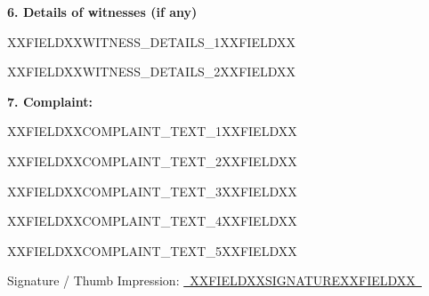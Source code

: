 \documentclass[12pt, a4paper]{article}
\newcommand{\fillline}[1]{\underline{~#1~}}
\begin{document}
\vspace{12pt}

\noindent\textbf{6. Details of witnesses (if any)}

\vspace{4pt}
\hspace{1cm}XXFIELDXXWITNESS_DETAILS_1XXFIELDXX

\vspace{4pt}
\hspace{1cm}XXFIELDXXWITNESS_DETAILS_2XXFIELDXX

\vspace{12pt}

\noindent\textbf{7. Complaint: }

\vspace{4pt}
\hspace{0.5cm}XXFIELDXXCOMPLAINT_TEXT_1XXFIELDXX

\vspace{4pt}
\hspace{0.5cm}XXFIELDXXCOMPLAINT_TEXT_2XXFIELDXX

\vspace{4pt}
\hspace{0.5cm}XXFIELDXXCOMPLAINT_TEXT_3XXFIELDXX

\vspace{4pt}
\hspace{0.5cm}XXFIELDXXCOMPLAINT_TEXT_4XXFIELDXX

\vspace{4pt}
\hspace{0.5cm}XXFIELDXXCOMPLAINT_TEXT_5XXFIELDXX

\vspace{30pt}



\vspace{20pt}

\noindent\hfill Signature / Thumb Impression: \fillline{XXFIELDXXSIGNATUREXXFIELDXX}
\end{document}
